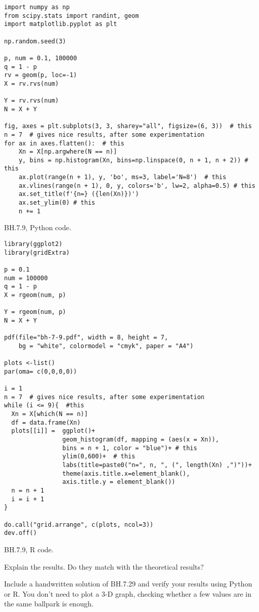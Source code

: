 \begin{listing}[!ht]
\begin{verbatim}
import numpy as np
from scipy.stats import randint, geom
import matplotlib.pyplot as plt

np.random.seed(3)

p, num = 0.1, 100000
q = 1 - p
rv = geom(p, loc=-1)
X = rv.rvs(num)

Y = rv.rvs(num)
N = X + Y

fig, axes = plt.subplots(3, 3, sharey="all", figsize=(6, 3))  # this
n = 7  # gives nice results, after some experimentation
for ax in axes.flatten():  # this
    Xn = X[np.argwhere(N == n)]
    y, bins = np.histogram(Xn, bins=np.linspace(0, n + 1, n + 2)) # this
    ax.plot(range(n + 1), y, 'bo', ms=3, label='N=8')  # this
    ax.vlines(range(n + 1), 0, y, colors='b', lw=2, alpha=0.5) # this
    ax.set_title(f'{n=} ({len(Xn)})')
    ax.set_ylim(0) # this
    n += 1
\end{verbatim}
\caption{BH.7.9, Python code.}
\label{BH.7.9.p}
\end{listing}


\begin{listing}[!ht]
\begin{verbatim}
library(ggplot2)
library(gridExtra)

p = 0.1
num = 100000
q = 1 - p
X = rgeom(num, p)

Y = rgeom(num, p)
N = X + Y

pdf(file="bh-7-9.pdf", width = 8, height = 7,
    bg = "white", colormodel = "cmyk", paper = "A4")

plots <-list()
par(oma= c(0,0,0,0))

i = 1
n = 7  # gives nice results, after some experimentation
while (i <= 9){  #this
  Xn = X[which(N == n)]
  df = data.frame(Xn)
  plots[[i]] =  ggplot()+
                geom_histogram(df, mapping = (aes(x = Xn)),
                bins = n + 1, color = "blue")+ # this
                ylim(0,600)+  # this
                labs(title=paste0("n=", n, ", (", length(Xn) ,")"))+
                theme(axis.title.x=element_blank(),
                axis.title.y = element_blank())
  n = n + 1
  i = i + 1
}

do.call("grid.arrange", c(plots, ncol=3))
dev.off()
\end{verbatim}
\caption{BH.7.9, R code.}
\label{BH.7.9.r}

\end{listing}

\begin{exercise}
Explain the results. Do they match with the theoretical results?
\end{exercise}

\begin{exercise}
  Include a handwritten solution of BH.7.29 and verify your results
  using Python or R.  You don't need to plot a 3-D graph, checking
  whether a few values are in the same ballpark is enough.
\end{exercise}
